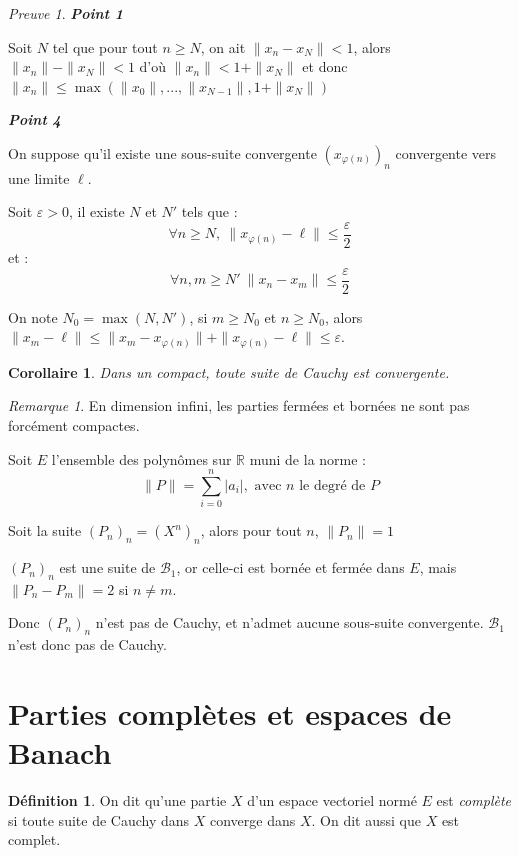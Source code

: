\documentclass[]{article}
\newtheorem{mycor}{Corollaire}
\theoremstyle{remark}
\newtheorem{myrem}{Remarque}
\newtheorem{myproof}{Preuve}
\theoremstyle{definition}
\newtheorem{mydef}{Définition}
\newenvironment{proofpart}[1]{
	\leavevmode
	
	\noindent
	{\textit{\textbf{\boldmath #1}}}
	
}{
	\checkmark
}
\begin{document}
\begin{myproof}
	\begin{proofpart}{Point 1}
		Soit $N$ tel que pour tout $n \geqslant N$, on ait $\|x_n - x_N\| < 1$, alors $\|x_n\| - \|x_N\|< 1$ d'où $\|x_n\| < 1 + \|x_N\|$
		et donc $\|x_n\| \leqslant \max (\|x_0\|, ..., \|x_{N-1}\|, 1 + \|x_N\|)$
	\end{proofpart}
	
	\begin{proofpart}{Point 4}
		On suppose qu'il existe une sous-suite convergente $(x_{\varphi(n)})_n$ convergente vers une limite $\ell$.
		
		Soit $\varepsilon > 0$, il existe $N$ et $N'$ tels que : $$\forall n \geqslant N, ~ \|x_{\varphi(n)} - \ell\| \leqslant \frac{\varepsilon}{2}$$
		et :
		$$\forall n, m \geqslant N' ~ \|x_n - x_m\| \leqslant \frac{\varepsilon}{2}$$
		
		On note $N_0 = \max (N, N')$, si $m \geqslant N_0$ et $n \geqslant N_0$, alors $\|x_m - \ell\| \leqslant \|x_m - x_{\varphi(n)}\| + \|x_{\varphi(n)} - \ell\| \leqslant \varepsilon$.
	\end{proofpart}
\end{myproof}

\begin{mycor}
	Dans un compact, toute suite de Cauchy est convergente.
\end{mycor}

\begin{myrem}
	En dimension infini, les parties fermées et bornées ne sont pas forcément compactes.
	
	Soit $E$ l'ensemble des polynômes sur $\mathbb{R}$ muni de la norme :
	$$\|P\| = \sum_{i=0}^{n} |a_i|, \text{ avec } n \text{ le degré de } P$$
	
	Soit la suite $(P_n)_n = (X^n)_n$, alors pour tout $n$, $\|P_n\|=1$
	
	$(P_n)_n$ est une suite de $\mathcal{B}_1$, or celle-ci est bornée et fermée dans $E$, mais $\|P_n-P_m\| = 2$ si $n \neq m$.
	
	Donc $(P_n)_n$ n'est pas de Cauchy, et n'admet aucune sous-suite convergente. $\mathcal{B}_1$ n'est donc pas de Cauchy.
\end{myrem}

\section{Parties complètes et espaces de Banach}

\begin{mydef}
	On dit qu'une partie $X$ d'un espace vectoriel normé $E$ est \textit{complète} si toute suite de Cauchy dans $X$ converge dans $X$. On dit aussi que $X$ est complet.
\end{mydef}
\end{document}
